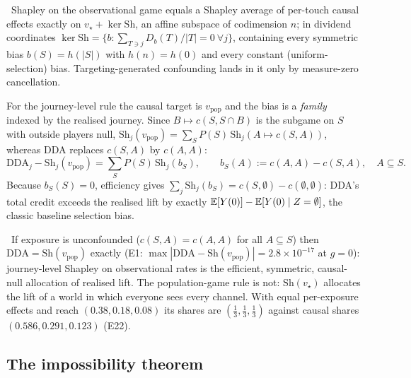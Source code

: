 \begin{proposition}
\label{attr:prop:class}
\tagEstablished\ Shapley on the observational game equals a Shapley average of per-touch causal effects exactly on $v_\star + \ker \mathrm{Sh}$, an affine subspace of codimension $n$; in dividend coordinates $\ker \mathrm{Sh} = \{b : \sum_{T \ni j} D_b(T)/|T| = 0\ \forall j\}$, containing every symmetric bias $b(S) = h(|S|)$ with $h(n) = h(0)$ and every constant (uniform-selection) bias. Targeting-generated confounding lands in it only by measure-zero cancellation.
\end{proposition}

For the journey-level rule the causal target is $v_{\mathrm{pop}}$ and the bias is a \emph{family} indexed by the realised journey. Since $B \mapsto c(S, S \cap B)$ is the subgame on $S$ with outside players null, $\mathrm{Sh}_j(v_{\mathrm{pop}}) = \sum_S P(S)\,\mathrm{Sh}_j(A \mapsto c(S,A))$, whereas DDA replaces $c(S,A)$ by $c(A,A)$:
\begin{equation}
\mathrm{DDA}_j - \mathrm{Sh}_j(v_{\mathrm{pop}}) = \sum_S P(S)\,\mathrm{Sh}_j(b_S), \qquad b_S(A) := c(A,A) - c(S,A),\quad A \subseteq S.
\label{eq:attr:ddabias}
\end{equation}
Because $b_S(S) = 0$, efficiency gives $\sum_j \mathrm{Sh}_j(b_S) = c(S,\emptyset) - c(\emptyset,\emptyset)$: DDA's total credit exceeds the realised lift by exactly $\mathbb{E}[Y(0)] - \mathbb{E}[Y(0) \mid Z = \emptyset]$, the classic baseline selection bias.

\begin{lemma}
\label{attr:lem:journey}
\tagEstablished\ If exposure is unconfounded ($c(S,A) = c(A,A)$ for all $A \subseteq S$) then $\mathrm{DDA} = \mathrm{Sh}(v_{\mathrm{pop}})$ exactly (E1: $\max|\mathrm{DDA} - \mathrm{Sh}(v_{\mathrm{pop}})| = 2.8\times10^{-17}$ at $g = 0$): journey-level Shapley on observational rates is the efficient, symmetric, causal-null allocation of realised lift. The population-game rule is not: $\mathrm{Sh}(v_\star)$ allocates the lift of a world in which everyone sees every channel. With equal per-exposure effects and reach $(0.38, 0.18, 0.08)$ its shares are $(\tfrac13, \tfrac13, \tfrac13)$ against causal shares $(0.586, 0.291, 0.123)$ (E22).
\end{lemma}

\subsection{The impossibility theorem}

